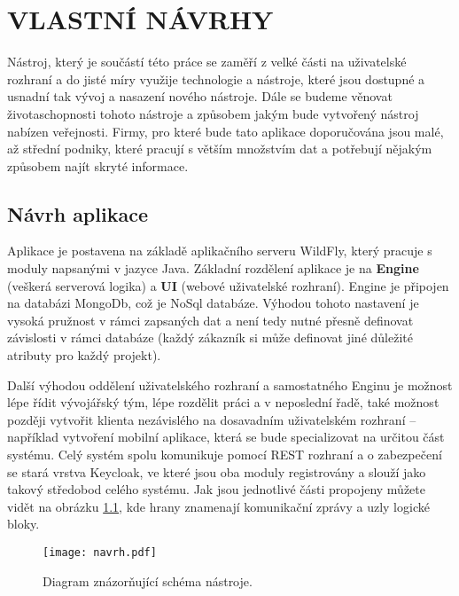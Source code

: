 \chapter{VLASTNÍ NÁVRHY}
\par Nástroj, který je součástí této práce se zaměří z velké části na uživatelské rozhraní a do jisté míry využije technologie a nástroje, které jsou dostupné a usnadní tak vývoj a nasazení nového nástroje. Dále se budeme věnovat  životaschopnosti tohoto nástroje a způsobem jakým bude vytvořený nástroj nabízen veřejnosti. Firmy, pro které bude tato aplikace doporučována jsou malé, až střední podniky, které pracují s větším množstvím dat a potřebují nějakým způsobem najít skryté informace.

\section{Návrh aplikace}
\par Aplikace je postavena na základě aplikačního serveru WildFly, který pracuje s moduly napsanými v jazyce Java. Základní rozdělení aplikace je na \textbf{Engine} (veškerá serverová logika) a \textbf{UI} (webové uživatelské rozhraní). Engine je připojen na databázi MongoDb, což je NoSql databáze. Výhodou tohoto nastavení je vysoká pružnost v rámci zapsaných dat a není tedy nutné přesně definovat závislosti v rámci databáze (každý zákazník si může definovat jiné důležité atributy pro každý projekt).

\par Další výhodou oddělení uživatelského rozhraní a samostatného Enginu je možnost lépe řídit vývojářský tým, lépe rozdělit práci a v neposlední řadě, také možnost později vytvořit klienta nezávislého na dosavadním uživatelském rozhraní -- například vytvoření mobilní aplikace, která se bude specializovat na určitou část systému. Celý systém spolu komunikuje pomocí REST rozhraní a o zabezpečení se stará vrstva Keycloak, ve které jsou oba moduly registrovány a slouží jako takový středobod celého systému. Jak jsou jednotlivé části propojeny můžete vidět na obrázku \ref{schema}, kde hrany znamenají komunikační zprávy a uzly logické bloky.

\begin{figure}[!htp]
\centering
\texttt{[image: navrh.pdf]}
\caption{Diagram znázorňující schéma nástroje.}
\label{schema}
\end{figure}

